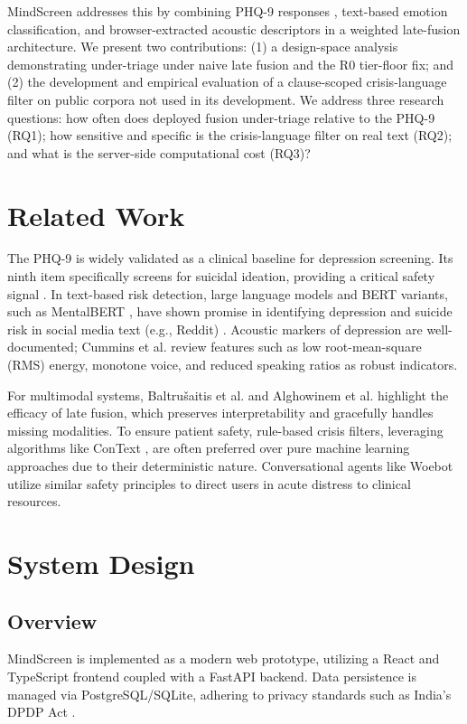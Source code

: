 \documentclass[conference]{IEEEtran}
\begin{document}
MindScreen addresses this by combining PHQ-9 responses \cite{kroenke_phq9}, text-based emotion classification, and browser-extracted acoustic descriptors in a weighted late-fusion architecture. We present two contributions: (1) a design-space analysis demonstrating under-triage under naive late fusion and the R0 tier-floor fix; and (2) the development and empirical evaluation of a clause-scoped crisis-language filter on public corpora not used in its development. We address three research questions: how often does deployed fusion under-triage relative to the PHQ-9 (RQ1); how sensitive and specific is the crisis-language filter on real text (RQ2); and what is the server-side computational cost (RQ3)?

\section{Related Work}
The PHQ-9 \cite{kroenke_phq9} is widely validated as a clinical baseline for depression screening. Its ninth item specifically screens for suicidal ideation, providing a critical safety signal \cite{rossom_item9, kroenke_phq8}. In text-based risk detection, large language models and BERT variants, such as MentalBERT \cite{ji_mentalbert}, have shown promise in identifying depression and suicide risk in social media text (e.g., Reddit) \cite{ruiz_reddit, zirikly_clpsych, mcbain_llm_suicide, moore_llm_stigma}. Acoustic markers of depression are well-documented; Cummins et al. \cite{cummins_speech} review features such as low root-mean-square (RMS) energy, monotone voice, and reduced speaking ratios as robust indicators. 

For multimodal systems, Baltru\v{s}aitis et al. \cite{baltrusaitis_survey} and Alghowinem et al. \cite{alghowinem_multimodal} highlight the efficacy of late fusion, which preserves interpretability and gracefully handles missing modalities. To ensure patient safety, rule-based crisis filters, leveraging algorithms like ConText \cite{harkema_context}, are often preferred over pure machine learning approaches due to their deterministic nature. Conversational agents like Woebot \cite{fitzpatrick_woebot} utilize similar safety principles to direct users in acute distress to clinical resources.

\section{System Design}

\subsection{Overview}
MindScreen is implemented as a modern web prototype, utilizing a React and TypeScript frontend coupled with a FastAPI backend. Data persistence is managed via PostgreSQL/SQLite, adhering to privacy standards such as India's DPDP Act \cite{pdpa_india}.
\end{document}
